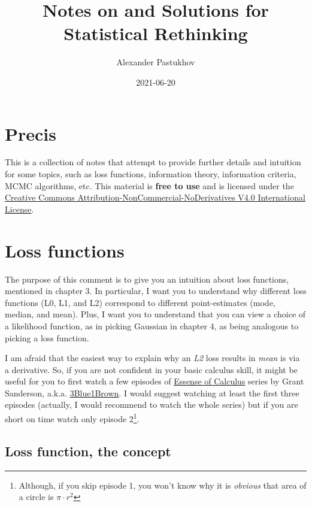 \documentclass[
]{book}
\title{Notes on and Solutions for Statistical Rethinking}
\author{Alexander Pastukhov}
\date{2021-06-20}
\begin{document}
\maketitle

{
\setcounter{tocdepth}{1}
\tableofcontents
}
\hypertarget{precis}{%
\chapter{Precis}\label{precis}}

This is a collection of notes that attempt to provide further details and intuition for some topics, such as loss functions, information theory, information criteria, MCMC algorithms, etc. This material is \textbf{free to use} and is licensed under the \href{https://creativecommons.org/licenses/by-nc-nd/4.0/}{Creative Commons Attribution-NonCommercial-NoDerivatives V4.0 International License}.

\hypertarget{loss-functions}{%
\chapter{Loss functions}\label{loss-functions}}

The purpose of this comment is to give you an intuition about loss functions, mentioned in chapter 3. In particular, I want you to understand why different loss functions (L0, L1, and L2) correspond to different point-estimates (mode, median, and mean). Plus, I want you to understand that you can view a choice of a likelihood function, as in picking Gaussian in chapter 4, as being analogous to picking a loss function.

I am afraid that the easiest way to explain why an \emph{L2} loss results in \emph{mean} is via a derivative. So, if you are not confident in your basic calculus skill, it might be useful for you to first watch a few episodes of \href{https://www.youtube.com/playlist?list=PLZHQObOWTQDMsr9K-rj53DwVRMYO3t5Yr}{Essense of Calculus} series by Grant Sanderson, a.k.a. \href{https://www.3blue1brown.com/}{3Blue1Brown}. I would suggest watching at least the first three episodes (actually, I would recommend to watch the whole series) but if you are short on time watch only episode 2\footnote{Although, if you skip episode 1, you won't know why it is \emph{obvious} that area of a circle is \(\pi\cdot r^2\)}.

\hypertarget{loss-function-the-concept}{%
\section{Loss function, the concept}\label{loss-function-the-concept}}
\end{document}
